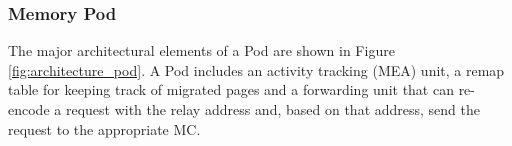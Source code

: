\subsubsection*{Memory Pod}

The major architectural elements of a Pod are shown in Figure \ref{fig:architecture_pod}. A Pod includes an activity tracking (MEA) unit, a remap table for keeping track of migrated pages and a forwarding unit that can re-encode a request with the relay address and, based on that address, send the request to the appropriate MC.
%

